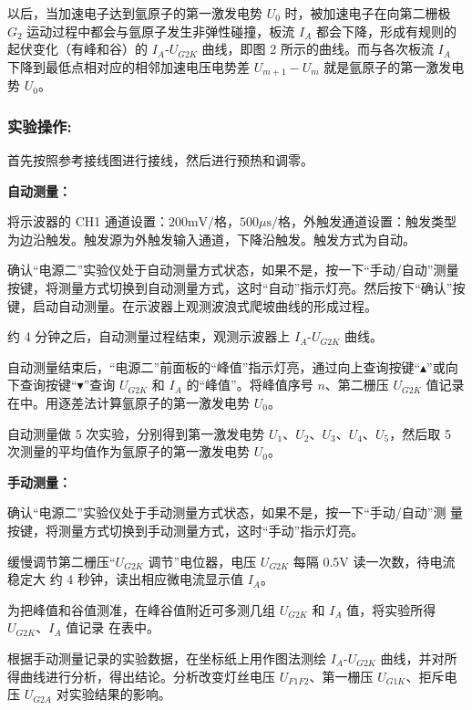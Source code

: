 \documentclass[10pt,a4paper]{ctexart}
\begin{document}
以后，当加速电子达到氩原子的第一激发电势 $U_0$ 时，被加速电子在向第二栅极 $G_2$ 运动过程中都会与氩原子发生非弹性碰撞，板流 $I_A$ 都会下降，形成有规则的起伏变化（有峰和谷）的 $I_A \text{-} U_{G2K}$ 曲线，即图 2 所示的曲线。而与各次板流 $I_A$ 下降到最低点相对应的相邻加速电压电势差 $U_{m+1}-U_m$ 就是氩原子的第一激发电势 $U_0$。
      
    
    \subsubsection*{实验操作:}

    首先按照参考接线图进行接线，然后进行预热和调零。
    
    \textbf{自动测量：}

将示波器的 CH1 通道设置：$200\text{mV}/\text{格}$，$500\mu\text{s}/\text{格}$，外触发通道设置：触发类型为边沿触发。触发源为外触发输入通道，下降沿触发。触发方式为自动。
    
确认“电源二”实验仪处于自动测量方式状态，如果不是，按一下“手动/自动”测量按键，将测量方式切换到自动测量方式，这时“自动”指示灯亮。然后按下“确认”按键，启动自动测量。在示波器上观测波浪式爬坡曲线的形成过程。
    
约 4 分钟之后，自动测量过程结束，观测示波器上 $I_A \text{-} U_{G2K}$ 曲线。
    
    自动测量结束后，“电源二”前面板的“峰值”指示灯亮，通过向上查询按键“$\blacktriangle$”或向下查询按键“$\blacktriangledown$”查询 $U_{G2K}$ 和 $I_A$ 的“峰值”。将峰值序号 $n$、第二栅压 $U_{G2K}$ 值记录在中。用逐差法计算氩原子的第一激发电势 $U_0$。
    
    自动测量做 5 次实验，分别得到第一激发电势 $U_1$、$U_2$、$U_3$、$U_4$、$U_5$，然后取 5 次测量的平均值作为氩原子的第一激发电势 $U_0$。

    \textbf{手动测量：}

    确认“电源二”实验仪处于手动测量方式状态，如果不是，按一下“手动/自动”测
量按键，将测量方式切换到手动测量方式，这时“手动”指示灯亮。

缓慢调节第二栅压“$U_{G2K}$ 调节”电位器，电压 $U_{G2K}$ 每隔 0.5V 读一次数，待电流稳定大
约 4 秒钟，读出相应微电流显示值 $I_A$。

为把峰值和谷值测准，在峰谷值附近可多测几组 $U_{G2K}$ 和 $I_A$ 值，将实验所得 $U_{G2K}$、$I_A$ 值记录
在表中。

根据手动测量记录的实验数据，在坐标纸上用作图法测绘 $I_A \text{-} U_{G2K}$ 曲线，并对所得曲线进行分析，得出结论。分析改变灯丝电压 $U_{F1F2}$、第一栅压 $U_{G1K}$、拒斥电压 $U_{G2A}$ 对实验结果的影响。
\end{document}
